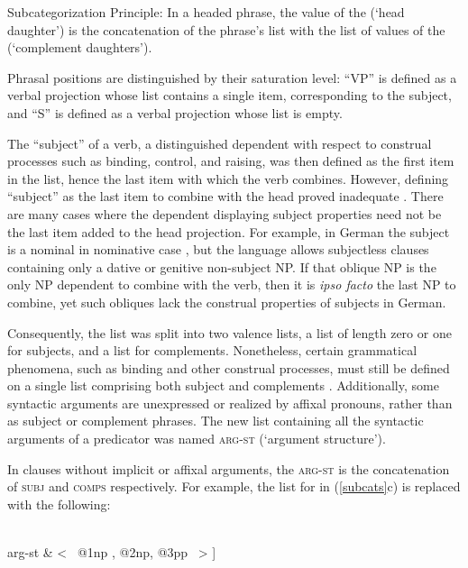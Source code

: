 \documentclass[output=paper
	        ,collection
	        ,collectionchapter
 	        ,biblatex
                ,babelshorthands
                ,newtxmath
                ,draftmode
                ,colorlinks, citecolor=brown
]{langscibook}
\begin{document}
\begin{exe}
\ex Subcategorization Principle: In a headed phrase, the \subcat value of the \headdtr (`head daughter') is the concatenation of the phrase's \subcat list with the list of \synsem values of the \compsdtrs (`complement daughters').
\end{exe}

\noindent
Phrasal positions are distinguished by their saturation level: ``VP'' is defined as a verbal projection whose \subcat list contains a single item, corresponding to the subject, and ``S'' is defined as a verbal projection whose  \subcat list is empty. 

The ``subject'' of a verb, a distinguished dependent with respect to construal processes such as binding, control, and raising, was then defined as the first item in the  \subcat list, hence the last item with which the verb combines.   However, defining ``subject'' as the last item to combine with the head proved inadequate \citep[Chapter~9]{pollard+sag:1994}.  There are many cases where the dependent displaying subject properties need not be the last item added to the head projection.  For example, in German the subject is a nominal in nominative case \citep{Reis82}, but the language allows subjectless clauses containing only a dative or genitive non-subject NP.  If that oblique  NP is the only NP dependent to combine with the verb, then it is \emph{ipso facto} the last NP to combine, yet such obliques lack the construal properties of subjects in German.  

Consequently, the \subcat list was split into two valence lists, a \subj list of length zero or one for subjects, and a \comps list for complements.  Nonetheless, certain grammatical phenomena, such as binding and other construal processes, must still be defined on a single list comprising both subject and complements \citep{Manning+Sag:1999}. Additionally, some syntactic arguments are unexpressed or realized by affixal pronouns, rather than as subject or complement phrases.  
The new list containing all the syntactic arguments of a predicator was named \textsc{arg-st} (`argument structure').  

In clauses without implicit or affixal arguments, the \textsc{arg-st} is the concatenation of  \textsc{subj}  and \textsc{comps}  respectively.  For example, the \subcat list for  in (\ref{subcats}c) is replaced with the following:

\begin{exe} 
	\label{put}
\ex	%
\begin{avm}
[ phon & < \rm put > \\
val & [ subj \ \ & <  \ {@1} \ > \\ 
comps \ \ & < \  {@2}, {@3} \  > ] \\ 
arg-st & < \ {@1}np , {@2}np, {@3}pp \  > ] 
\end{avm}
\end{exe}
\end{document}
